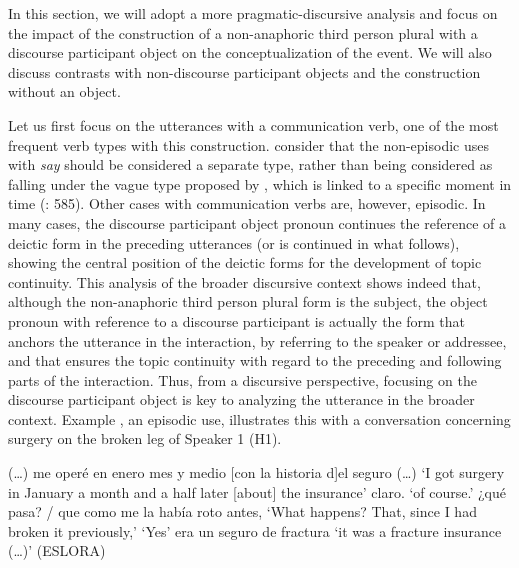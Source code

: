 \documentclass[output=paper]{langscibook}
\begin{document}
In this section, we will adopt a more pragmatic-discursive analysis and focus on the impact of the construction of a non-anaphoric third person plural with a discourse participant object on the conceptualization of the event. We will also discuss contrasts with non-discourse participant objects and the construction without an object.


Let us first focus on the utterances with a communication verb, one of the most frequent verb types with this construction. \citeauthor{SiewierskaPapastathi2011} consider that the non-episodic uses with \textit{say} should be considered a separate type, rather than being considered as falling under the vague type proposed by \citet{CabredoHofherr2003, CabredoHofherr2006}, which is linked to a specific moment in time (\citealt{SiewierskaPapastathi2011}: 585). Other cases with communication verbs are, however, episodic. In many cases, the discourse participant object pronoun continues the reference of a deictic form in the preceding utterances (or is continued in what follows), showing the central position of the deictic forms for the development of topic continuity. This analysis of the broader discursive context shows indeed that, although the non-anaphoric third person plural form is the subject, the object pronoun with reference to a discourse participant is actually the form that anchors the utterance in the interaction, by referring to the speaker or addressee, and that ensures the topic continuity with regard to the preceding and following parts of the interaction. Thus, from a discursive perspective, focusing on the discourse participant object is key to analyzing the utterance in the broader context. Example , an episodic use, illustrates this with a conversation concerning surgery on the broken leg of Speaker 1 (H1). 


\ea\label{ex:pierre:17}
\begin{xlist}[Speaker 3]
 (…) me operé en enero mes y medio {}{ {[con la historia d]el seguro} }
 (…) ‘I got surgery in January a month and a half later {  } {[about] the insurance’}
 claro.
 ‘of course.’
 ¿qué pasa? / que como me la había roto antes, 
 ‘What happens? That, since I had broken it previously,’ 
 ‘Yes’ 
 era un seguro de fractura
 ‘it was a fracture insurance (…)’ (ESLORA)
\end{xlist}
\z 
\end{document}
